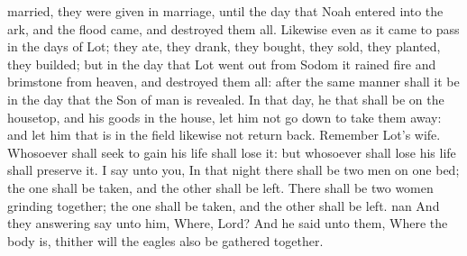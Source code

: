 married, they were given in marriage, until the day that Noah entered into the ark, and the flood came, and destroyed them all. Likewise even as it came to pass in the days of Lot; they ate, they drank, they bought, they sold, they planted, they builded; but in the day that Lot went out from Sodom it rained fire and brimstone from heaven, and destroyed them all: after the same manner shall it be in the day that the Son of man is revealed. In that day, he that shall be on the housetop, and his goods in the house, let him not go down to take them away: and let him that is in the field likewise not return back. Remember Lot’s wife. Whosoever shall seek to gain his life shall lose it: but whosoever shall lose his life shall preserve it. I say unto you, In that night there shall be two men on one bed; the one shall be taken, and the other shall be left. There shall be two women grinding together; the one shall be taken, and the other shall be left. nan And they answering say unto him, Where, Lord? And he said unto them, Where the body is, thither will the eagles also be gathered together. 

